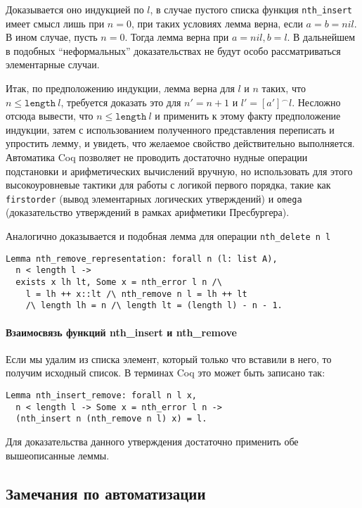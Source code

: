 Доказывается оно индукцией по $l$, в случае пустого списка функция \texttt{nth\_insert} имеет смысл лишь при $n = 0$, при таких условиях лемма верна, если $a = b = nil$. В ином случае, пусть $n = 0$. Тогда лемма верна при $a = nil, b = l$. В дальнейшем в подобных ``неформальных''  доказательствах не будут особо рассматриваться элементарные случаи.

Итак, по предположению индукции, лемма верна для $l$ и $n$ таких, что $n \leq \texttt{length}\ l$, требуется доказать это для $n' = n + 1$ и $l' = [a']^\frown l$. Несложно отсюда вывести, что $n \leq \texttt{length}\ l$ и применить к этому факту предположение индукции, затем с использованием полученного представления переписать и упростить лемму, и увидеть, что желаемое свойство действительно выполняется. Автоматика Coq позволяет не проводить достаточно нудные операции подстановки и арифметических вычислений вручную, но использовать для этого высокоуровневые тактики для работы с логикой первого порядка, такие как \texttt{firstorder} (вывод элементарных логических утверждений) и \texttt{omega} (доказательство утверждений в рамках арифметики Пресбургера).

Аналогично доказывается и подобная лемма для операции \texttt{nth\_delete n l}
\begin{lstlisting}
Lemma nth_remove_representation: forall n (l: list A),
  n < length l ->
  exists x lh lt, Some x = nth_error l n /\
    l = lh ++ x::lt /\ nth_remove n l = lh ++ lt
    /\ length lh = n /\ length lt = (length l) - n - 1.
\end{lstlisting}

\paragraph{Взаимосвязь функций nth\_insert и nth\_remove} Если мы удалим из списка элемент, который только что вставили в него, то получим исходный список. В терминах Coq это может быть записано так:
\begin{lstlisting}
Lemma nth_insert_remove: forall n l x,
  n < length l -> Some x = nth_error l n ->
  (nth_insert n (nth_remove n l) x) = l.
\end{lstlisting}

Для доказательства данного утверждения достаточно применить обе вышеописанные леммы.

\subsection{Замечания по автоматизации}

